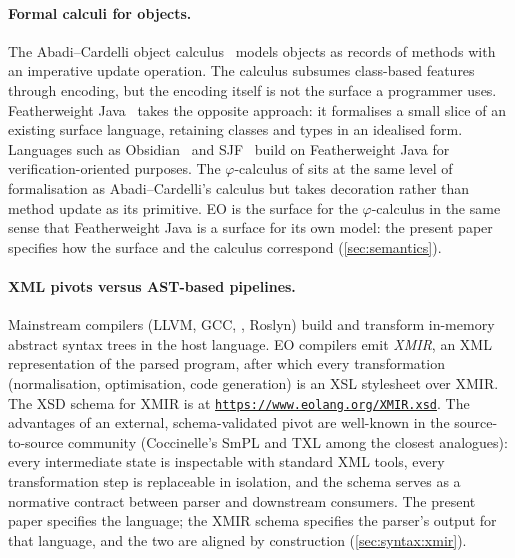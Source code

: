 \paragraph{Formal calculi for objects.}
The Abadi--Cardelli object calculus~\citep{abadi1995imperative} models
  objects as records of methods with an imperative update operation.
The calculus subsumes class-based features through encoding, but the
  encoding itself is not the surface a programmer uses.
Featherweight Java~\citep{igarashi2001featherweight} takes the opposite
  approach: it formalises a small slice of an existing surface language,
  retaining classes and types in an idealised form.
Languages such as Obsidian~\citep{coblenz2019} and SJF~\citep{usov2020}
  build on Featherweight Java for verification-oriented purposes.
The \(\varphi\)-calculus of \citet{bugayenko2021eolang} sits at the same
  level of formalisation as Abadi--Cardelli's calculus but takes
  decoration rather than method update as its primitive.
EO is the surface for the \(\varphi\)-calculus in the same sense that
  Featherweight Java is a surface for its own model:
  the present paper specifies how the surface and the calculus correspond
  (\cref{sec:semantics}).

\paragraph{XML pivots versus AST-based pipelines.}
Mainstream compilers (LLVM, GCC, , Roslyn) build and
  transform in-memory abstract syntax trees in the host language.
EO compilers emit \emph{XMIR}, an XML representation of the parsed
  program, after which every transformation
  (normalisation, optimisation, code generation) is an XSL stylesheet
  over XMIR.
The XSD schema for XMIR is at \href{https://www.eolang.org/XMIR.xsd}{\texttt{https://www.eolang.org/XMIR.xsd}}.
The advantages of an external, schema-validated pivot are well-known
  in the source-to-source community
  (Coccinelle's SmPL and TXL among the closest analogues):
  every intermediate state is inspectable with standard XML tools,
  every transformation step is replaceable in isolation,
  and the schema serves as a normative contract between parser and
  downstream consumers.
The present paper specifies the language; the XMIR schema specifies the
  parser's output for that language, and the two are aligned by
  construction (\cref{sec:syntax:xmir}).

